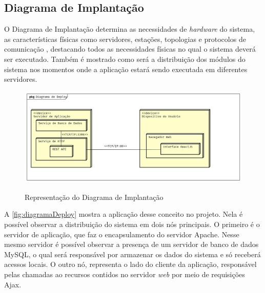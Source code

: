 \subsection{Diagrama de Implantação}
\label{sec:titSecDiagDeploy}

O Diagrama de Implantação determina as necessidades de \textit{hardware} do sistema, as características físicas como servidores, estações, topologias e protocolos de comunicação \cite{guedes2018uml}, destacando todos as necessidades físicas no qual o sistema deverá ser executado. Também é mostrado como será a distribuição dos módulos do sistema nos momentos onde a aplicação estará sendo executada em diferentes servidores.

\begin{figure}[H]
    \centering
    \caption{Representação do Diagrama de Implantação}
    \includegraphics[width=13cm]{./dados/analise/diagramadeploy.jpg}
    \label{fig:diagramaDeploy}
\end{figure}

A \autoref{fig:diagramaDeploy} mostra a aplicação desse conceito no projeto. Nela é possível observar a distribuição do sistema em dois nós principais. O primeiro é o servidor de aplicação, que faz o encapsulamento do servidor Apache. Nesse mesmo servidor é possível observar a presença de um servidor de banco de dados MySQL, o qual será responsável por armazenar os dados do sistema e só receberá acessos locais.
O outro nó, representa o lado do cliente da aplicação, responsável pelas chamadas ao recursos contidos no servidor \textit{web} por meio de requisições Ajax.
